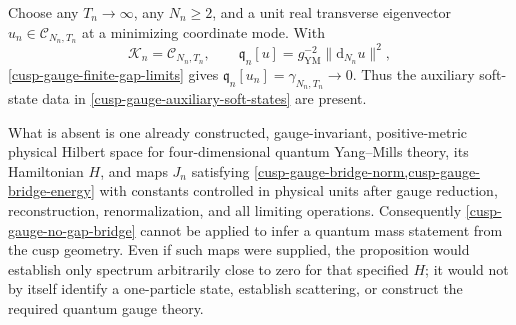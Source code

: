 \begin{remark}
\label{cusp-gauge-missing-physical-bridge}
Choose any \(T_n\to\infty\), any \(N_n\ge2\), and a unit real transverse
eigenvector \(u_n\in\mathscr C_{N_n,T_n}\) at a minimizing coordinate
mode.  With
\[
 \mathcal K_n=\mathscr C_{N_n,T_n},\qquad
 \mathfrak q_n[u]
 =g_{\mathrm{YM}}^{-2}\lVert\mathrm d_{N_n}u\rVert^2,
\]
\cref{cusp-gauge-finite-gap-limits} gives
\(\mathfrak q_n[u_n]=\gamma_{N_n,T_n}\to0\).  Thus the auxiliary
soft-state data in \cref{cusp-gauge-auxiliary-soft-states} are present.

What is absent is one already constructed, gauge-invariant,
positive-metric physical Hilbert space for four-dimensional quantum
Yang--Mills theory, its Hamiltonian \(H\), and maps \(J_n\) satisfying
\cref{cusp-gauge-bridge-norm,cusp-gauge-bridge-energy} with constants
controlled in physical units after gauge reduction, reconstruction,
renormalization, and all limiting operations.  Consequently
\cref{cusp-gauge-no-gap-bridge} cannot be applied to infer a quantum mass
statement from the cusp geometry.  Even if such maps were supplied, the
proposition would establish only spectrum arbitrarily close to zero for
that specified \(H\); it would not by itself identify a one-particle state,
establish scattering, or construct the required quantum gauge theory.
\end{remark}
